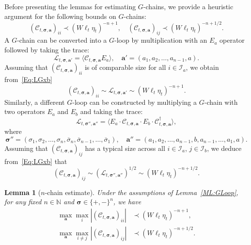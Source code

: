 \documentclass[10pt,reqno]{article}
\renewcommand{\bar}{\overline}
\theoremstyle{plain} %
\newtheorem{lemma}[theorem]{Lemma}
\theoremstyle{remark}
\numberwithin{equation}{section}
\begin{document}
Before presenting the lemmas for estimating $G$-chains, we provide a heuristic argument for the following bounds on  $G$-chains:
\begin{equation}\label{res:heur_Chain}
    \left( \mathcal{C}_{t, \boldsymbol{\sigma}, \mathbf{a}} \right)_{ii} \prec (W\ell_t\eta_t)^{-n+1}, \quad 
    \left( \mathcal{C}_{t, \boldsymbol{\sigma}, \mathbf{a}} \right)_{ij} \prec (W\ell_t\eta_t)^{-n+1/2}.
\end{equation}
A $G$-chain can be converted into a $G$-loop by multiplication with an $E_a$ operator followed by taking the trace:
\[
\mathcal{L}_{t, \boldsymbol{\sigma}, \mathbf{a}'} = \langle \mathcal{C}_{t, \boldsymbol{\sigma}, \mathbf{a}} E_a \rangle, \quad \mathbf{a}' = (a_1, a_2, \ldots, a_{n-1}, a).
\]
Assuming that \( \left(\mathcal{C}_{t, \boldsymbol{\sigma}, \mathbf{a}}\right)_{ii} \) is of comparable size for all \( i \in \mathcal{I}_a \), we obtain from~\eqref{Eq:LGxb}
\[
\left(\mathcal{C}_{t, \boldsymbol{\sigma}, \mathbf{a}}\right)_{ii} \sim \mathcal{L}_{t, \boldsymbol{\sigma}, \mathbf{a}'} \sim (W\ell_t\eta_t)^{-n+1}.
\]
Similarly, a different $G$-loop can be constructed by multiplying a $G$-chain with two operators $E_a$ and $E_b$ and taking the trace:
\[
\mathcal{L}_{t, \boldsymbol{\sigma}'', \mathbf{a}''} = \langle E_a \cdot \mathcal{C}_{t, \boldsymbol{\sigma}, \mathbf{a}} \cdot E_b \cdot \mathcal{C}^\dagger_{t, \boldsymbol{\sigma}, \mathbf{a}} \rangle,
\]
where
\[
\boldsymbol{\sigma}'' = (\sigma_1, \sigma_2, \ldots, \sigma_n, \bar{\sigma}_n, \bar{\sigma}_{n-1}, \ldots, \bar{\sigma}_1), \quad 
\mathbf{a}'' = (a_1, a_2, \ldots, a_{n-1}, b, a_{n-1}, \ldots, a_1, a).
\]
Assuming that \( \left(\mathcal{C}_{t, \boldsymbol{\sigma}, \mathbf{a}}\right)_{ij} \) has a typical size across all \( i \in \mathcal{I}_a \), \( j \in \mathcal{I}_b \), we deduce from~\eqref{Eq:LGxb} that
\[
\left(\mathcal{C}_{t, \boldsymbol{\sigma}, \mathbf{a}}\right)_{ij} \sim \left( \mathcal{L}_{t, \boldsymbol{\sigma}'', \mathbf{a}''} \right)^{1/2} \sim (W\ell_t\eta_t)^{-n+1/2}.
\]

\begin{lemma}[$n$-chain estimate]\label{lem_GbEXP_n2}  
Under the assumptions of Lemma~\ref{ML:GLoop}, for any fixed \( n \in \mathbb{N} \) and \( \boldsymbol{\sigma} \in \{+, -\}^n \), we have
\begin{align}\label{res_XICdi}
    \max_{\mathbf{a}} \max_i \left| \left( \mathcal{C}_{t, \boldsymbol{\sigma}, \mathbf{a}} \right)_{ii} \right| 
    &\prec \left(W \ell_t \eta_t\right)^{-n+1}, \\\label{res_XICoff}
    \max_{\mathbf{a}} \max_{i \ne j} \left| \left( \mathcal{C}_{t, \boldsymbol{\sigma}, \mathbf{a}} \right)_{ij} \right| 
    &\prec \left(W \ell_t \eta_t\right)^{-n + 1/2}.
\end{align}
\end{lemma}
\end{document}

